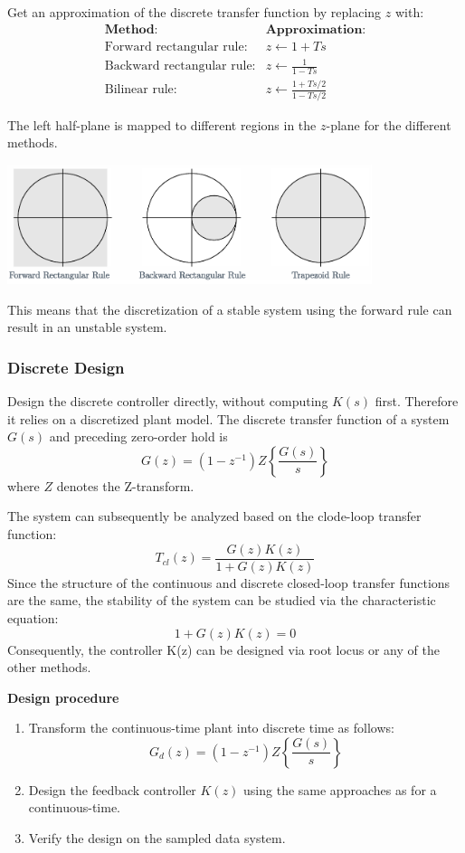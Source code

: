 Get an approximation of the discrete transfer function by replacing $z$ with:
$$\begin{array}{cc}
  \textbf{Method:}& \textbf{Approximation:} \\
  \text{Forward rectangular rule:}& z\gets 1+Ts \\
  \text{Backward rectangular rule:}& z\gets \frac{1}{1-Ts} \\
  \text{Bilinear rule:}& z\gets \frac{1+Ts/2}{1-Ts/2}
\end{array}$$

The left half-plane is mapped to different regions in the $z$-plane for the different methods.
\begin{center}
	\includegraphics[width=0.8\textwidth]{Images/digitization-mapping.png}
\end{center}
This means that the discretization of a stable system using the forward rule can result in an unstable system.




\subsubsection{Discrete Design}
Design the discrete controller directly, without computing $K(s)$ first.
Therefore it relies on a discretized plant model. The discrete transfer function of a system $G(s)$ and preceding
zero-order hold is
$$G(z) = (1-z^{-1}) Z  \left\{\frac{G(s)}{s}\right\}$$
where $Z$ denotes the Z-transform.

The system can subsequently be analyzed based on the clode-loop transfer function:
$$T_{cl}(z)=\frac{G(z)K(z)}{1+G(z)K(z)}$$
Since the structure of the continuous and discrete closed-loop transfer functions are the same, the stability of the system can be studied via the characteristic equation:
$$1+G(z)K(z)=0$$
Consequently, the controller K(z) can be designed via root locus or any of the other methods.

\textbf{Design procedure}
\begin{enumerate}
  \item Transform the continuous-time plant into discrete time as follows:
    $$G_d(z) = (1-z^{-1}) Z  \left\{\frac{G(s)}{s}\right\}$$
  \item Design the feedback controller $K(z)$ using the same approaches as for a continuous-time.
  \item Verify the design on the sampled data system.
\end{enumerate}

